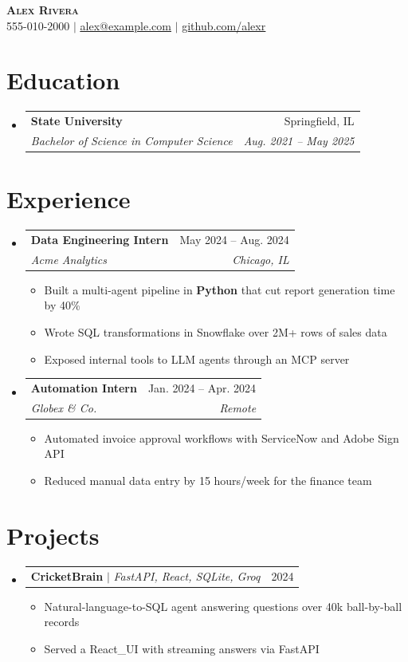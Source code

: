 \documentclass[letterpaper,11pt]{article}
\makeatletter
\newcommand{\resumeItem}[1]{
  \item\small{
    {#1 \vspace{-2pt}}
  }
}
\newcommand{\resumeSubheading}[4]{
  \vspace{-2pt}\item
    \begin{tabular*}{0.97\textwidth}[t]{l@{\extracolsep{\fill}}r}
      \textbf{#1} & #2 \\
      \textit{\small#3} & \textit{\small #4} \\
    \end{tabular*}\vspace{-7pt}
}
\newcommand{\resumeProjectHeading}[2]{
    \item
    \begin{tabular*}{0.97\textwidth}{l@{\extracolsep{\fill}}r}
      \small#1 & #2 \\
    \end{tabular*}\vspace{-7pt}
}
\newcommand{\resumeSubHeadingListStart}{\begin{itemize}[leftmargin=0.15in, label={}]}
\newcommand{\resumeSubHeadingListEnd}{\end{itemize}}
\newcommand{\resumeItemListStart}{\begin{itemize}}
\newcommand{\resumeItemListEnd}{\end{itemize}\vspace{-5pt}}
\makeatother
\begin{document}
\begin{center}
    \textbf{\Huge \scshape Alex Rivera} \\ \vspace{1pt}
    \small 555-010-2000 $|$ \href{mailto:alex@example.com}{\underline{alex@example.com}} $|$
    \href{https://github.com/alexr}{\underline{github.com/alexr}}
\end{center}

\section{Education}
  \resumeSubHeadingListStart
    \resumeSubheading
      {State University}{Springfield, IL}
      {Bachelor of Science in Computer Science}{Aug. 2021 -- May 2025}
  \resumeSubHeadingListEnd

\section{Experience}
  \resumeSubHeadingListStart

    \resumeSubheading
      {Data Engineering Intern}{May 2024 -- Aug. 2024}
      {Acme Analytics}{Chicago, IL}
      \resumeItemListStart
        \resumeItem{Built a multi-agent pipeline in \textbf{Python} that cut report generation time by 40\%}
        \resumeItem{Wrote SQL transformations in Snowflake over 2M+ rows of sales data}
        \resumeItem{Exposed internal tools to LLM agents through an MCP server}
      \resumeItemListEnd

    \resumeSubheading
      {Automation Intern}{Jan. 2024 -- Apr. 2024}
      {Globex \& Co.}{Remote}
      \resumeItemListStart
        \resumeItem{Automated invoice approval workflows with ServiceNow and Adobe Sign API}
        \resumeItem{Reduced manual data entry by 15 hours/week for the finance team}
      \resumeItemListEnd

  \resumeSubHeadingListEnd

\section{Projects}
    \resumeSubHeadingListStart
      \resumeProjectHeading
          {\textbf{CricketBrain} $|$ \emph{FastAPI, React, SQLite, Groq}}{2024}
          \resumeItemListStart
            \resumeItem{Natural-language-to-SQL agent answering questions over 40k ball-by-ball records}
            \resumeItem{Served a React\_UI with streaming answers via FastAPI}
          \resumeItemListEnd
    \resumeSubHeadingListEnd
\end{document}
